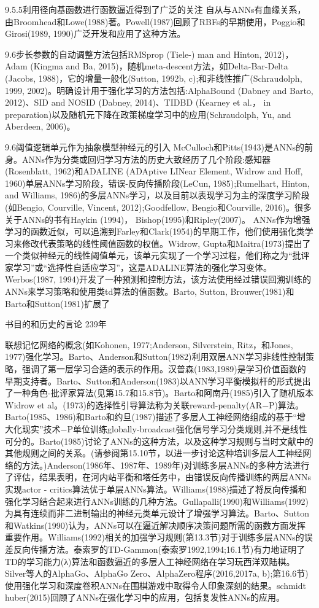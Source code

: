 {9.5.5利用径向基函数进行函数逼近得到了广泛的关注
自从与ANNs有血缘关系，由Broomhead和Lowe(1988)著。Powell(1987)回顾了RBFs的早期使用，Poggio和Girosi(1989, 1990)广泛开发和应用了这种方法。

9.6步长参数的自动调整方法包括RMSprop (Tiele-)
man and Hinton, 2012)， Adam (Kingma and Ba, 2015)，随机meta-descent方法，如Delta-Bar-Delta (Jacobs, 1988)，它的增量一般化(Sutton, 1992b, c);和非线性推广(Schraudolph, 1999, 2002)。明确设计用于强化学习的方法包括:AlphaBound (Dabney and Barto, 2012)、SID and NOSID (Dabney, 2014)、TIDBD (Kearney et al.， in preparation)以及随机元下降在政策梯度学习中的应用(Schraudolph, Yu, and Aberdeen, 2006)。

9.6阈值逻辑单元作为抽象模型神经元的引入
McCulloch和Pitts(1943)是ANNs的前身。ANNs作为分类或回归学习方法的历史大致经历了几个阶段:感知器(Rosenblatt, 1962)和ADALINE (ADAptive LINear Element, Widrow and Hoff, 1960)单层ANNs学习阶段，错误-反向传播阶段(LeCun, 1985);Rumelhart, Hinton, and Williams, 1986)的多层ANNs学习，以及目前以表现学习为主的深度学习阶段(如Bengio, Courville, Vincent, 2012);Goodfellow, Bengio和Courville, 2016)。很多关于ANNs的书有Haykin (1994)， Bishop(1995)和Ripley(2007)。
ANNs作为增强学习的函数近似，可以追溯到Farley和Clark(1954)的早期工作，他们使用强化类学习来修改代表策略的线性阈值函数的权值。Widrow, Gupta和Maitra(1973)提出了一个类似神经元的线性阈值单元，该单元实现了一个学习过程，他们称之为“批评家学习”或“选择性自适应学习”，这是ADALINE算法的强化学习变体。Werbos(1987, 1994)开发了一种预测和控制方法，该方法使用经过错误回溯训练的ANNs来学习策略和使用类td算法的值函数。Barto, Sutton, Brouwer(1981)和Barto和Sutton(1981)扩展了

书目的和历史的言论 					239年



联想记忆网络的概念(如Kohonen, 1977;Anderson, Silverstein, Ritz，和Jones, 1977)强化学习。Barto、Anderson和Sutton(1982)利用双层ANN学习非线性控制策略，强调了第一层学习合适的表示的作用。汉普森(1983,1989)是学习价值函数的早期支持者。Barto、Sutton和Anderson(1983)以ANN学习平衡模拟杆的形式提出了一种角色-批评家算法(见第15.7和15.8节)。Barto和阿南丹(1985)引入了随机版本Widrow et al。(1973)的选择性引导算法称为关联reward-penalty(AR−P)算法。Barto(1985、1986)和Barto和约旦(1987)描述了多层人工神经网络组成的基于“增大化现实”技术−P单位训练globally-broadcast强化信号学习分类规则,并不是线性可分的。Barto(1985)讨论了ANNs的这种方法，以及这种学习规则与当时文献中的其他规则之间的关系。(请参阅第15.10节，以进一步讨论这种培训多层人工神经网络的方法。)Anderson(1986年、1987年、1989年)对训练多层ANNs的多种方法进行了评估，结果表明，在河内站平衡和塔任务中，由错误反向传播训练的两层ANNs实现actor - critics算法优于单层ANNs算法。Williams(1988)描述了将反向传播和强化学习结合起来进行ANNs训练的几种方法。Gullapalli(1990)和Williams(1992)为具有连续而非二进制输出的神经元类单元设计了增强学习算法。Barto、Sutton和Watkins(1990)认为，ANNs可以在逼近解决顺序决策问题所需的函数方面发挥重要作用。Williams(1992)相关的加强学习规则(第13.3节)对于训练多层ANNs的误差反向传播方法。泰索罗的TD-Gammon(泰索罗1992,1994;16.1节)有力地证明了TD的学习能力(λ)算法和函数逼近的多层人工神经网络在学习玩西洋双陆棋。Silver等人的AlphaGo、AlphaGo Zero、AlphaZero程序(2016,2017a, b);第16.6节)使用强化学习和深度卷积ANNs在围棋游戏中取得令人印象深刻的结果。schmidt huber(2015)回顾了ANNs在强化学习中的应用，包括复发性ANNs的应用。

}
